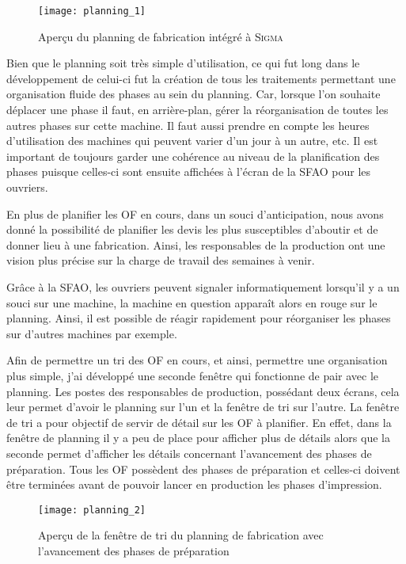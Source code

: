 \FloatBarrier
\begin{figure}[h!]
    \begin{center}
        \texttt{[image: planning\_1]}
    \end{center}
    \caption{Aperçu du planning de fabrication intégré à \textsc{Sigma}}
    \label{figure:planning_1}
\end{figure}
\FloatBarrier

Bien que le planning soit très simple d'utilisation, ce qui fut long dans le développement de celui-ci fut la création de tous les traitements permettant une organisation fluide des phases au sein du planning.
Car, lorsque l'on souhaite déplacer une phase il faut, en arrière-plan, gérer la réorganisation de toutes les autres phases sur cette machine.
Il faut aussi prendre en compte les heures d'utilisation des machines qui peuvent varier d'un jour à un autre, etc.
Il est important de toujours garder une cohérence au niveau de la planification des phases puisque celles-ci sont ensuite affichées à l'écran de la SFAO pour les ouvriers.

En plus de planifier les OF en cours, dans un souci d'anticipation, nous avons donné la possibilité de planifier les devis les plus susceptibles d'aboutir et de donner lieu à une fabrication.
Ainsi, les responsables de la production ont une vision plus précise sur la charge de travail des semaines à venir.

Grâce à la SFAO, les ouvriers peuvent signaler informatiquement lorsqu'il y a un souci sur une machine, la machine en question apparaît alors en rouge sur le planning.
Ainsi, il est possible de réagir rapidement pour réorganiser les phases sur d'autres machines par exemple.

Afin de permettre un tri des OF en cours, et ainsi, permettre une organisation plus simple, j'ai développé une seconde fenêtre qui fonctionne de pair avec le planning.
Les postes des responsables de production, possédant deux écrans, cela leur permet d'avoir le planning sur l'un et la fenêtre de tri sur l'autre.
La fenêtre de tri a pour objectif de servir de détail sur les OF à planifier.
En effet, dans la fenêtre de planning il y a peu de place pour afficher plus de détails alors que la seconde permet d'afficher les détails concernant l'avancement des phases de préparation.
Tous les OF possèdent des phases de préparation et celles-ci doivent être terminées avant de pouvoir lancer en production les phases d'impression.

\FloatBarrier
\begin{figure}[h!]
    \begin{center}
        \texttt{[image: planning\_2]}
    \end{center}
    \caption{Aperçu de la fenêtre de tri du planning de fabrication avec l'avancement des phases de préparation}
    \label{figure:planning_2}
\end{figure}
\FloatBarrier

